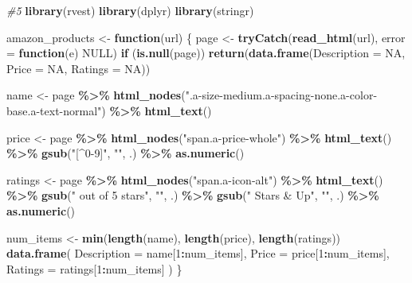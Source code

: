 \documentclass[
]{article}
\newenvironment{Shaded}{\begin{snugshade}}{\end{snugshade}}
\newcommand{\AttributeTok}[1]{\textcolor[rgb]{0.13,0.29,0.53}{#1}}
\newcommand{\CommentTok}[1]{\textcolor[rgb]{0.56,0.35,0.01}{\textit{#1}}}
\newcommand{\ConstantTok}[1]{\textcolor[rgb]{0.56,0.35,0.01}{#1}}
\newcommand{\ControlFlowTok}[1]{\textcolor[rgb]{0.13,0.29,0.53}{\textbf{#1}}}
\newcommand{\DecValTok}[1]{\textcolor[rgb]{0.00,0.00,0.81}{#1}}
\newcommand{\FunctionTok}[1]{\textcolor[rgb]{0.13,0.29,0.53}{\textbf{#1}}}
\newcommand{\NormalTok}[1]{#1}
\newcommand{\OtherTok}[1]{\textcolor[rgb]{0.56,0.35,0.01}{#1}}
\newcommand{\SpecialCharTok}[1]{\textcolor[rgb]{0.81,0.36,0.00}{\textbf{#1}}}
\newcommand{\StringTok}[1]{\textcolor[rgb]{0.31,0.60,0.02}{#1}}
\begin{document}
\begin{Shaded}
\begin{Highlighting}[]
\CommentTok{\#5 }
\FunctionTok{library}\NormalTok{(rvest)}
\FunctionTok{library}\NormalTok{(dplyr)}
\FunctionTok{library}\NormalTok{(stringr)}

\NormalTok{amazon\_products }\OtherTok{\textless{}{-}} \ControlFlowTok{function}\NormalTok{(url) \{}
\NormalTok{  page }\OtherTok{\textless{}{-}} \FunctionTok{tryCatch}\NormalTok{(}\FunctionTok{read\_html}\NormalTok{(url), }\AttributeTok{error =} \ControlFlowTok{function}\NormalTok{(e) }\ConstantTok{NULL}\NormalTok{)}
  \ControlFlowTok{if}\NormalTok{ (}\FunctionTok{is.null}\NormalTok{(page)) }\FunctionTok{return}\NormalTok{(}\FunctionTok{data.frame}\NormalTok{(}\AttributeTok{Description =} \ConstantTok{NA}\NormalTok{, }\AttributeTok{Price =} \ConstantTok{NA}\NormalTok{, }\AttributeTok{Ratings =} \ConstantTok{NA}\NormalTok{))}

\NormalTok{  name }\OtherTok{\textless{}{-}}\NormalTok{ page }\SpecialCharTok{\%\textgreater{}\%}
    \FunctionTok{html\_nodes}\NormalTok{(}\StringTok{".a{-}size{-}medium.a{-}spacing{-}none.a{-}color{-}base.a{-}text{-}normal"}\NormalTok{) }\SpecialCharTok{\%\textgreater{}\%}
    \FunctionTok{html\_text}\NormalTok{()}

\NormalTok{  price }\OtherTok{\textless{}{-}}\NormalTok{ page }\SpecialCharTok{\%\textgreater{}\%}
    \FunctionTok{html\_nodes}\NormalTok{(}\StringTok{"span.a{-}price{-}whole"}\NormalTok{) }\SpecialCharTok{\%\textgreater{}\%}
    \FunctionTok{html\_text}\NormalTok{() }\SpecialCharTok{\%\textgreater{}\%}
    \FunctionTok{gsub}\NormalTok{(}\StringTok{"[\^{}0{-}9]"}\NormalTok{, }\StringTok{""}\NormalTok{, .) }\SpecialCharTok{\%\textgreater{}\%}
    \FunctionTok{as.numeric}\NormalTok{()}

\NormalTok{  ratings }\OtherTok{\textless{}{-}}\NormalTok{ page }\SpecialCharTok{\%\textgreater{}\%}
    \FunctionTok{html\_nodes}\NormalTok{(}\StringTok{"span.a{-}icon{-}alt"}\NormalTok{) }\SpecialCharTok{\%\textgreater{}\%}
    \FunctionTok{html\_text}\NormalTok{() }\SpecialCharTok{\%\textgreater{}\%}
    \FunctionTok{gsub}\NormalTok{(}\StringTok{" out of 5 stars"}\NormalTok{, }\StringTok{""}\NormalTok{, .) }\SpecialCharTok{\%\textgreater{}\%}
    \FunctionTok{gsub}\NormalTok{(}\StringTok{" Stars \& Up"}\NormalTok{, }\StringTok{""}\NormalTok{, .) }\SpecialCharTok{\%\textgreater{}\%}
    \FunctionTok{as.numeric}\NormalTok{()}

\NormalTok{  num\_items }\OtherTok{\textless{}{-}} \FunctionTok{min}\NormalTok{(}\FunctionTok{length}\NormalTok{(name), }\FunctionTok{length}\NormalTok{(price), }\FunctionTok{length}\NormalTok{(ratings))}
  \FunctionTok{data.frame}\NormalTok{(}
    \AttributeTok{Description =}\NormalTok{ name[}\DecValTok{1}\SpecialCharTok{:}\NormalTok{num\_items],}
    \AttributeTok{Price =}\NormalTok{ price[}\DecValTok{1}\SpecialCharTok{:}\NormalTok{num\_items],}
    \AttributeTok{Ratings =}\NormalTok{ ratings[}\DecValTok{1}\SpecialCharTok{:}\NormalTok{num\_items]}
\NormalTok{  )}
\NormalTok{\}}


\end{Highlighting}
\end{Shaded}
\end{document}
